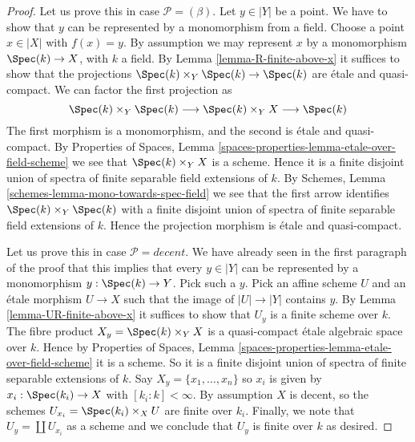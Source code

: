 \begin{proof}
Let us prove this in case $\mathcal{P} = (\beta)$. Let $y \in |Y|$ be
a point. We have to show that $y$ can be represented by a monomorphism
from a field. Choose a point $x \in |X|$ with $f(x) = y$.
By assumption we may represent $x$ by a monomorphism
$\Spec(k) \to X$, with $k$ a field. By
Lemma \ref{lemma-R-finite-above-x}
it suffices to show that the projections
$\Spec(k) \times_Y \Spec(k) \to \Spec(k)$
are \'etale and quasi-compact. We can factor the first projection as
$$
\Spec(k) \times_Y \Spec(k)
\longrightarrow
\Spec(k) \times_Y X
\longrightarrow
\Spec(k)
$$
The first morphism is a monomorphism, and the second is \'etale and
quasi-compact. By
Properties of Spaces,
Lemma \ref{spaces-properties-lemma-etale-over-field-scheme}
we see that $\Spec(k) \times_Y X$ is a scheme. Hence it is a
finite disjoint union of spectra of finite separable field extensions
of $k$. By
Schemes, Lemma \ref{schemes-lemma-mono-towards-spec-field}
we see that the first arrow identifies
$\Spec(k) \times_Y \Spec(k)$ with a finite disjoint
union of spectra of finite separable field extensions of $k$.
Hence the projection morphism is \'etale and quasi-compact.

\medskip\noindent
Let us prove this in case $\mathcal{P} = decent$.
We have already seen in the first paragraph of the proof that this implies
that every $y \in |Y|$ can be represented by a monomorphism
$y : \Spec(k) \to Y$. Pick such a $y$. Pick an affine
scheme $U$ and an \'etale morphism $U \to X$ such that the image
of $|U| \to |Y|$ contains $y$. By
Lemma \ref{lemma-UR-finite-above-x}
it suffices to show that $U_y$ is a finite scheme over $k$. The fibre
product $X_y = \Spec(k) \times_Y X$ is a quasi-compact \'etale
algebraic space over $k$. Hence by
Properties of Spaces,
Lemma \ref{spaces-properties-lemma-etale-over-field-scheme}
it is a scheme. So it is a finite disjoint union of spectra of
finite separable extensions of $k$. Say $X_y = \{x_1, \ldots, x_n\}$
so $x_i$ is given by  $x_i : \Spec(k_i) \to X$ with
$[k_i : k] < \infty$. By assumption $X$ is decent, so the schemes
$U_{x_i} = \Spec(k_i) \times_X U$ are finite over $k_i$.
Finally, we note that $U_y = \coprod U_{x_i}$ as a scheme and we conclude
that $U_y$ is finite over $k$ as desired.


\end{proof}

